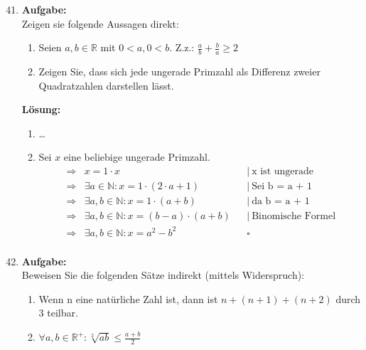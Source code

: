 \documentclass[11pt, a4paper]{article}
\begin{document}
\begin{enumerate}
    \setcounter{enumi}{40}
    \item {\bfseries Aufgabe:\\}
    Zeigen sie folgende Aussagen direkt:\\
    \begin{enumerate}
        \item Seien $a, b \in \mathbb{R}$ mit $0 < a, 0 < b$. Z.z.: $\frac{a}{b} + \frac{b}{a} \geq 2$\\
        \item Zeigen Sie, dass sich jede ungerade Primzahl als Differenz zweier Quadratzahlen darstellen
        lässt.\\
    \end{enumerate}
    {\bfseries Lösung:\\}
    \begin{enumerate}
        \item \dots
        \item Sei $x$ eine beliebige ungerade Primzahl.
        \begin{align*}
            \Rightarrow& x = 1 \cdot x &&|~\text{x ist ungerade}\\
            \Rightarrow& \exists a \in \mathbb{N}: x = 1 \cdot (2 \cdot a + 1) &&|~\text{Sei b = a + 1}\\
            \Rightarrow& \exists a, b \in \mathbb{N}: x = 1 \cdot (a + b) &&|~\text{da b = a + 1}\\
            \Rightarrow& \exists a, b \in \mathbb{N}: x = (b - a) \cdot (a + b) &&|~\text{Binomische Formel}\\
            \Rightarrow& \exists a, b \in \mathbb{N}: x = a^2 - b^2 &&\square\\
        \end{align*}
    \end{enumerate}
    \item {\bfseries Aufgabe:\\}
    Beweisen Sie die folgenden Sätze indirekt (mittels Widerspruch):\\
    \begin{enumerate}
        \item Wenn n eine natürliche Zahl ist, dann ist $n + (n + 1) + (n + 2)$ durch $3$ teilbar.\\
        \item $\forall a, b \in \mathbb{R}^+: \sqrt[2]{ab} \leq \frac{a+b}{2}$\\
    \end{enumerate}

\end{enumerate}
\end{document}
